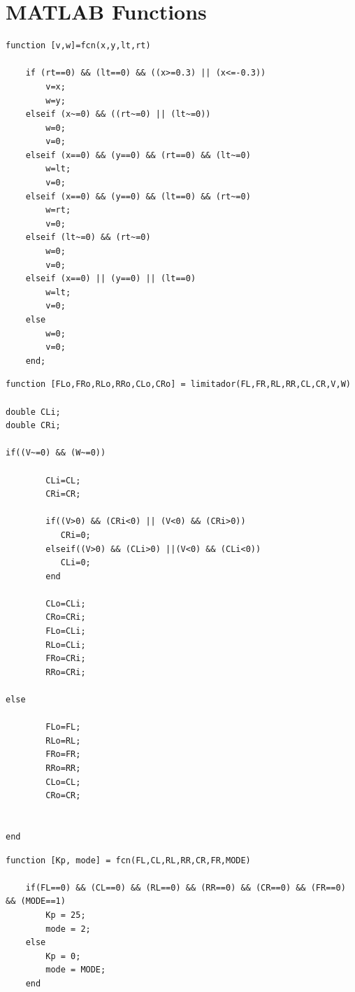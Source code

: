 \chapter{MATLAB Functions} \label{MATLAB Functions}
\blankpage

\begin{lstlisting}[caption={XBox - V y W}, label={XBox - V y W}, basicstyle=\scriptsize]
function [v,w]=fcn(x,y,lt,rt)

    if (rt==0) && (lt==0) && ((x>=0.3) || (x<=-0.3))
        v=x;
        w=y;
    elseif (x~=0) && ((rt~=0) || (lt~=0))
        w=0;
        v=0;
    elseif (x==0) && (y==0) && (rt==0) && (lt~=0)
        w=lt;
        v=0;
    elseif (x==0) && (y==0) && (lt==0) && (rt~=0)
        w=rt;
        v=0;
    elseif (lt~=0) && (rt~=0)
        w=0;
        v=0;
    elseif (x==0) || (y==0) || (lt==0) 
        w=lt;
        v=0;
    else
        w=0;
        v=0;
    end;
\end{lstlisting}

\begin{lstlisting}[caption={MCI - Limitador}, label={MCI - Limitador}, basicstyle=\scriptsize]
function [FLo,FRo,RLo,RRo,CLo,CRo] = limitador(FL,FR,RL,RR,CL,CR,V,W)

double CLi;
double CRi;

if((V~=0) && (W~=0))
    
        CLi=CL;
        CRi=CR;
        
        if((V>0) && (CRi<0) || (V<0) && (CRi>0)) 
           CRi=0; 
        elseif((V>0) && (CLi>0) ||(V<0) && (CLi<0)) 
           CLi=0;
        end
        
        CLo=CLi;
        CRo=CRi;
        FLo=CLi;
        RLo=CLi;
        FRo=CRi;
        RRo=CRi;         
    
else
    
        FLo=FL;
        RLo=RL;
        FRo=FR;
        RRo=RR;
        CLo=CL;
        CRo=CR;
    

end
\end{lstlisting}

\begin{lstlisting}[caption={Kp\_Control}, label={Kp_Control}, basicstyle=\scriptsize]
function [Kp, mode] = fcn(FL,CL,RL,RR,CR,FR,MODE)

    if(FL==0) && (CL==0) && (RL==0) && (RR==0) && (CR==0) && (FR==0) && (MODE==1)
        Kp = 25;
        mode = 2;
    else
        Kp = 0;
        mode = MODE;
    end
\end{lstlisting}
\blankpage